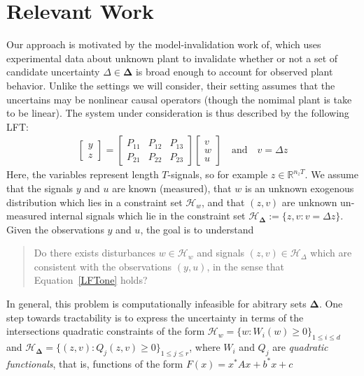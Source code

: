 \documentclass[11pt]{article} %
\newcommand{\R}{\mathbb{R}}
\theoremstyle{plain}
\theoremstyle{definition}
\theoremstyle{remark}
\begin{document}
\section{Relevant Work}
Our approach is motivated by the model-invalidation work of\cite{smith2002nonlinear}, which uses experimental data about unknown plant to invalidate whether or not a set of candidate uncertainty $\Delta \in \boldsymbol{\Delta}$ is broad enough to account for observed plant behavior. Unlike the settings we will consider, their setting assumes that the uncertains may be nonlinear causal operators (though the nomimal plant is take to be linear). The system under consideration is thus described by the following LFT:
\begin{eqnarray}\label{LFTone}
\begin{bmatrix} y \\
z
\end{bmatrix} = \begin{bmatrix} P_{11} & P_{12} & P_{13} \\
P_{21} & P_{22} & P_{23}
\end{bmatrix}\begin{bmatrix} v \\
w \\
u
\end{bmatrix} \quad \text{and} \quad v = \Delta z
\end{eqnarray}
Here, the variables represent length $T$-signals, so for example $z \in \R^{n_zT}$. We assume that the signals $y$ and $u$ are known (measured), that $w$ is an unknown exogenous distribution which lies in a constraint set $\mathcal{H}_w$, and that $(z,v)$ are unknown un-measured internal signals which lie in the constraint set $\mathcal{H}_{ \boldsymbol{\Delta}} := \{z,v : v = \Delta z\}$. Given the observations $y$ and $u$, the goal is to understand
\begin{quote}
Do there exists disturbances $w \in \mathcal{H}_w$ and signals $(z,v) \in \mathcal{H}_{\Delta}$ which are consistent with the observations $(y,u)$, in the sense that Equation~\ref{LFTone} holds?
\end{quote}
In general, this problem is computationally infeasible for abitrary sets $\boldsymbol{\Delta}$. One step towards tractability is to express the uncertainty in terms of the intersections quadratic constraints of the form $\mathcal{H}_{w} = \{w: W_i(w) \ge 0\}_{1\le i \le d}$ and $\mathcal{H}_{\boldsymbol{\Delta}} = \{(z,v): Q_j(z,v) \ge 0 \}_{1 \le j \le r}$, where $W_i$ and $Q_j$ are \emph{quadratic functionals}, that is, functions of the form $F(x) = x^*Ax + b^*x + c$
\end{document}
